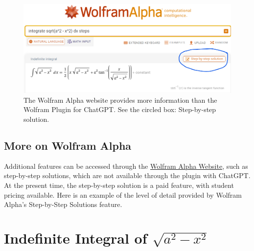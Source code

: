 




\vspace*{.5cm} 

\begin{figure}[ht]%
\centering
\includegraphics[width=0.9\columnwidth]{graphics/Chap07/WolframAlphaStepByStepSolutions.png}%
    \caption[]{The Wolfram Alpha website provides more information than the Wolfram Plugin for ChatGPT. See the circled box: Step-by-step solution.}
    \label{fig:WolframAlpha}
\end{figure}

\subsection{More on Wolfram Alpha}

Additional features can be accessed through the \href{https://www.wolframalpha.com/examples/pro-features/step-by-step-solutions/step-by-step-calculus}{Wolfram Alpha Website}, such as step-by-step solutions, which are not available through the plugin with ChatGPT. At the present time, the step-by-step solution is a paid feature, with student pricing available. Here is an example of the level of detail provided by Wolfram Alpha's Step-by-Step Solutions feature.

\section*{Indefinite Integral of \( \sqrt{a^2 - x^2} \)}

